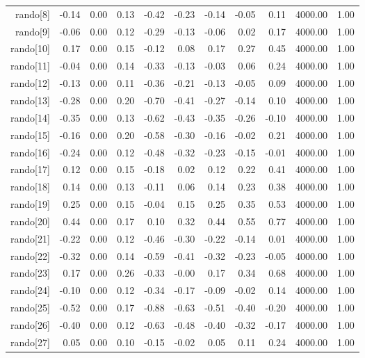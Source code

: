 \begin{table}[ht]
\begin{tabular}{rrrrrrrrrrr}
  rando[8] & -0.14 & 0.00 & 0.13 & -0.42 & -0.23 & -0.14 & -0.05 & 0.11 & 4000.00 & 1.00 \\ 
  rando[9] & -0.06 & 0.00 & 0.12 & -0.29 & -0.13 & -0.06 & 0.02 & 0.17 & 4000.00 & 1.00 \\ 
  rando[10] & 0.17 & 0.00 & 0.15 & -0.12 & 0.08 & 0.17 & 0.27 & 0.45 & 4000.00 & 1.00 \\ 
  rando[11] & -0.04 & 0.00 & 0.14 & -0.33 & -0.13 & -0.03 & 0.06 & 0.24 & 4000.00 & 1.00 \\ 
  rando[12] & -0.13 & 0.00 & 0.11 & -0.36 & -0.21 & -0.13 & -0.05 & 0.09 & 4000.00 & 1.00 \\ 
  rando[13] & -0.28 & 0.00 & 0.20 & -0.70 & -0.41 & -0.27 & -0.14 & 0.10 & 4000.00 & 1.00 \\ 
  rando[14] & -0.35 & 0.00 & 0.13 & -0.62 & -0.43 & -0.35 & -0.26 & -0.10 & 4000.00 & 1.00 \\ 
  rando[15] & -0.16 & 0.00 & 0.20 & -0.58 & -0.30 & -0.16 & -0.02 & 0.21 & 4000.00 & 1.00 \\ 
  rando[16] & -0.24 & 0.00 & 0.12 & -0.48 & -0.32 & -0.23 & -0.15 & -0.01 & 4000.00 & 1.00 \\ 
  rando[17] & 0.12 & 0.00 & 0.15 & -0.18 & 0.02 & 0.12 & 0.22 & 0.41 & 4000.00 & 1.00 \\ 
  rando[18] & 0.14 & 0.00 & 0.13 & -0.11 & 0.06 & 0.14 & 0.23 & 0.38 & 4000.00 & 1.00 \\ 
  rando[19] & 0.25 & 0.00 & 0.15 & -0.04 & 0.15 & 0.25 & 0.35 & 0.53 & 4000.00 & 1.00 \\ 
  rando[20] & 0.44 & 0.00 & 0.17 & 0.10 & 0.32 & 0.44 & 0.55 & 0.77 & 4000.00 & 1.00 \\ 
  rando[21] & -0.22 & 0.00 & 0.12 & -0.46 & -0.30 & -0.22 & -0.14 & 0.01 & 4000.00 & 1.00 \\ 
  rando[22] & -0.32 & 0.00 & 0.14 & -0.59 & -0.41 & -0.32 & -0.23 & -0.05 & 4000.00 & 1.00 \\ 
  rando[23] & 0.17 & 0.00 & 0.26 & -0.33 & -0.00 & 0.17 & 0.34 & 0.68 & 4000.00 & 1.00 \\ 
  rando[24] & -0.10 & 0.00 & 0.12 & -0.34 & -0.17 & -0.09 & -0.02 & 0.14 & 4000.00 & 1.00 \\ 
  rando[25] & -0.52 & 0.00 & 0.17 & -0.88 & -0.63 & -0.51 & -0.40 & -0.20 & 4000.00 & 1.00 \\ 
  rando[26] & -0.40 & 0.00 & 0.12 & -0.63 & -0.48 & -0.40 & -0.32 & -0.17 & 4000.00 & 1.00 \\ 
  rando[27] & 0.05 & 0.00 & 0.10 & -0.15 & -0.02 & 0.05 & 0.11 & 0.24 & 4000.00 & 1.00 \\ 

\end{tabular}
\end{table}
